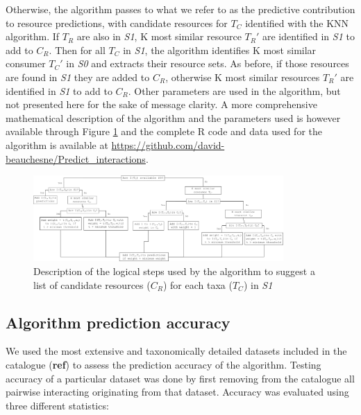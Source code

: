 \documentclass[letterpaper]{article}
\begin{document}
Otherwise, the algorithm passes to what we refer to as the predictive contribution to resource predictions, with candidate resources for $T_C$ identified with the KNN algorithm. If $T_R$ are also in \textit{S1}, K most similar resource $T_R'$ are identified in \textit{S1} to add to $C_R$. Then for all $T_C$ in \textit{S1}, the algorithm identifies K most similar consumer $T_C'$ in \textit{S0} and extracts their resource sets. As before, if those resources are found in \textit{S1} they are added to $C_R$, otherwise K most similar resources $T_R'$ are identified in \textit{S1} to add to $C_R$. Other parameters are used in the algorithm, but not presented here for the sake of message clarity. A more comprehensive mathematical description of the algorithm and the parameters used is however available through Figure \ref{fig:decision_diag} and the complete R code and data used for the algorithm is available at \href{https://github.com/david-beauchesne/Predict_interactions}{https://github.com/david-beauchesne/Predict\_interactions}.

        \begin{figure}[h]
          \centering\includegraphics[width=0.85\textwidth]{Decision_Diagram.png}
          \caption{Description of the logical steps used by the algorithm to suggest a list of candidate resources ($C_R$) for each taxa ($T_C$) in \textit{S1}}
          \label{fig:decision_diag}
        \end{figure}

\subsection{Algorithm prediction accuracy}
We used the most extensive and taxonomically detailed datasets included in the catalogue (\textbf{ref}) to assess the prediction accuracy of the algorithm. Testing accuracy of a particular dataset was done by first removing from the catalogue all pairwise interacting originating from that dataset. Accuracy was evaluated using three different statistics:
\end{document}
